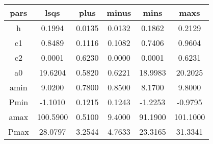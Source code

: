 \begin{table}
\begin{tabular}{cccccc}
\hline \hline
pars & lsqs & plus & minus & mins & maxs \\
\hline
h & 0.1994 & 0.0135 & 0.0132 & 0.1862 & 0.2129 \\
c1 & 0.8489 & 0.1116 & 0.1082 & 0.7406 & 0.9604 \\
c2 & 0.0001 & 0.6230 & 0.0000 & 0.0001 & 0.6231 \\
a0 & 19.6204 & 0.5820 & 0.6221 & 18.9983 & 20.2025 \\
amin & 9.0200 & 0.7800 & 0.8500 & 8.1700 & 9.8000 \\
Pmin & -1.1010 & 0.1215 & 0.1243 & -1.2253 & -0.9795 \\
amax & 100.5900 & 0.5100 & 9.4000 & 91.1900 & 101.1000 \\
Pmax & 28.0797 & 3.2544 & 4.7633 & 23.3165 & 31.3341 \\
\hline
\end{tabular}
\end{table}
